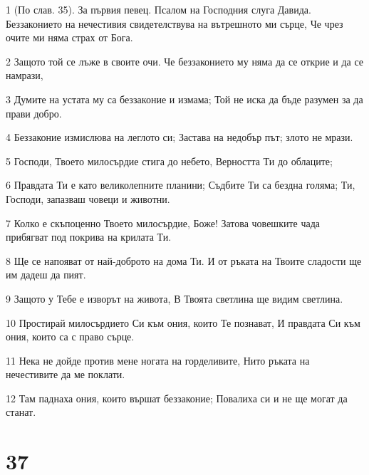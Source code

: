 \par 1 (По слав. 35). За първия певец. Псалом на Господния слуга Давида. Беззаконието на нечестивия свидетелствува на вътрешното ми сърце, Че чрез очите ми няма страх от Бога.
\par 2 Защото той се лъже в своите очи. Че беззаконието му няма да се открие и да се намрази,
\par 3 Думите на устата му са беззаконие и измама; Той не иска да бъде разумен за да прави добро.
\par 4 Беззаконие измислюва на леглото си; Застава на недобър път; злото не мрази.
\par 5 Господи, Твоето милосърдие стига до небето, Верността Ти до облаците;
\par 6 Правдата Ти е като великолепните планини; Съдбите Ти са бездна голяма; Ти, Господи, запазваш човеци и животни.
\par 7 Колко е скъпоценно Твоето милосърдие, Боже! Затова човешките чада прибягват под покрива на крилата Ти.
\par 8 Ще се напояват от най-доброто на дома Ти. И от ръката на Твоите сладости ще им дадеш да пият.
\par 9 Защото у Тебе е изворът на живота, В Твоята светлина ще видим светлина.
\par 10 Простирай милосърдието Си към ония, които Те познават, И правдата Си към ония, които са с право сърце.
\par 11 Нека не дойде против мене ногата на горделивите, Нито ръката на нечестивите да ме поклати.
\par 12 Там паднаха ония, които вършат беззаконие; Повалиха си и не ще могат да станат.

\chapter{37}

